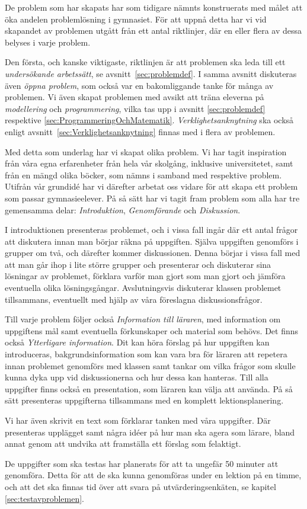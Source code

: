 \textcolor{lila}{De problem som har skapats har som tidigare nämnts konstruerats med målet att öka andelen problemlösning i gymnasiet. För att uppnå detta har vi vid skapandet av problemen utgått från ett antal riktlinjer, där en eller flera av dessa belyses i varje problem.}

\textcolor{lila}{Den första, och kanske viktigaste, riktlinjen är att problemen ska leda till ett \textsl{undersökande arbetssätt}, se avsnitt~\ref{sec:problemdef}. I samma avsnitt diskuteras även \textsl{öppna problem}, som också var en bakomliggande tanke för många av problemen. Vi även skapat problemen med avsikt att träna eleverna på \textsl{modellering} och \textsl{programmering}, vilka tas upp i avsnitt \ref{sec:problemdef} respektive \ref{sec:ProgrammeringOchMatematik}. \textsl{Verklighetsanknytning} ska också enligt avsnitt~\ref{sec:Verklighetsanknytning} finnas med i flera av problemen.}

\textcolor{lila}{Med detta som underlag har vi skapat olika problem. Vi har tagit inspiration från våra egna erfarenheter från hela vår skolgång, inklusive universitetet, samt från en mängd olika böcker, som nämns i samband med respektive problem. Utifrån vår grundidé har vi därefter arbetat oss vidare för att skapa ett problem som passar gymnasieelever. På så sätt har vi tagit fram problem som alla har tre gemensamma delar: \textsl{Introduktion}, \textsl{Genomförande} och \textsl{Diskussion}.}

\textcolor{lila}{I introduktionen presenteras problemet, och i vissa fall ingår där ett antal frågor att diskutera innan man börjar räkna på uppgiften. Själva uppgiften genomförs i grupper om två, och därefter kommer diskussionen. Denna börjar i vissa fall med att man går ihop i lite större grupper och presenterar och diskuterar sina lösningar av problemet, förklara varför man gjort som man gjort och jämföra eventuella olika lösningsgångar. Avslutningsvis diskuterar klassen problemet tillsammans, eventuellt med hjälp av våra föreslagna diskussionsfrågor.} 

\textcolor{lila}{Till varje problem följer också \textsl{Information till läraren}, med information om uppgiftens mål samt eventuella förkunskaper och material som behövs. Det finns också \textsl{Ytterligare information}. Dit kan höra förslag på hur uppgiften kan introduceras, bakgrundsinformation som kan vara bra för läraren att repetera innan problemet genomförs med klassen samt tankar om vilka frågor som skulle kunna dyka upp vid diskussionerna och hur dessa kan hanteras. Till alla uppgifter finns också en presentation, som läraren kan välja att använda. På så sätt presenteras uppgifterna tillsammans med en komplett lektionsplanering.}

\textcolor{lila}{Vi har även skrivit en text som förklarar tanken med våra uppgifter. Där presenteras upplägget samt några idéer på hur man ska agera som lärare, bland annat genom att undvika att framställa ett förslag som felaktigt.}

\textcolor{lila}{De uppgifter som ska testas har planerats för att ta ungefär 50 minuter att genomföra. Detta för att de ska kunna genomföras under en lektion på en timme, och att det ska finnas tid över att svara på utvärderingsenkäten, se kapitel \ref{sec:testavproblemen}.}